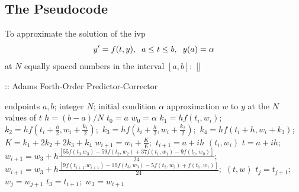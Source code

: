 \documentclass[12pt,oneside]{book}
\begin{document}
\begin{spacing}{1.2}
			
			\subsection*{The Pseudocode}
				To approximate the solution of the \ac{ivp} 
				\[ y' = f(t,y), \hspace*{0.2cm} a \leq t \leq b, \hspace*{0.2cm} y(a) = \alpha \]
				at $ N $ equally spaced numbers in the interval $ [a, b]: $ []
				
				\begin{algorithm}[H]
					\caption{:: Adams Forth-Order Predictor-Corrector}
					\begin{algorithmic}[1]
						\REQUIRE endpoints $ a, b $; \hspace*{0.2cm} integer $ N $; \hspace*{0.2cm} initial condition $ \alpha $
						\ENSURE approximation $ w $ to $ y $ at the $ N $ values of $ t $
						\STATE $ h = (b - a) / N $
						\STATE $ t_0 = a $
						\STATE $ w_0 = \alpha $
						\FOR{$ i = 0, 1, 2 $}
							\STATE $ k_1 = hf(t_{i}, w_{i}); $ 
							\STATE $ k_2 = hf(t_{i} + \frac{h}{2}, w_{i} + \frac{k_{1}}{2}); $
							\STATE $ k_3 = hf(t_{i} + \frac{h}{2}, w_{i} + \frac{k_{2}}{2}); $
							\STATE $ k_4 = hf(t_{i} + h, w_{i} + k_{3}); $
							\STATE $ K = k_{1} + 2k_{2} + 2k_{3} + k_{4} $
							\STATE $ w_{i+1} = w_{i} + \frac{K}{6}; $
							\STATE $ t_{i+1} = a + ih $
							\RETURN $ (t_{i}, w_{i}) $
						\ENDFOR
							\STATE $ t = a + ih; $
							\STATE $ w_{i+1} = w_{3} + h \frac{[ 55f(t_{3}. w_{3}) - 59f(t_{2}, w_{2}) + 37f(t_{1}, w_{1}) - 9f(t_{0}, w_{0}) ]}{24}; $ 
							\STATE $ w_{i+1} = w_{3} + h \frac{[ 9f(t_{i+1}. w_{i+1}) - 19f(t_{3}, w_{3}) - 5f(t_{2}, w_{2}) + f(t_{1}, w_{1}) ]}{24}; $ 
							\RETURN $ (t, w) $
								\STATE $ t_{j} = t_{j+1}; $
								\STATE $ w_{j} = w_{j+1} $
							\ENDFOR
							\STATE $ t_{3} = t_{i+1}; $
							\STATE $ w_{3} = w_{i+1} $
						\ENDFOR
					\end{algorithmic}
				\end{algorithm}
			
		\end{spacing}
		
		\clearpage
\end{document}
